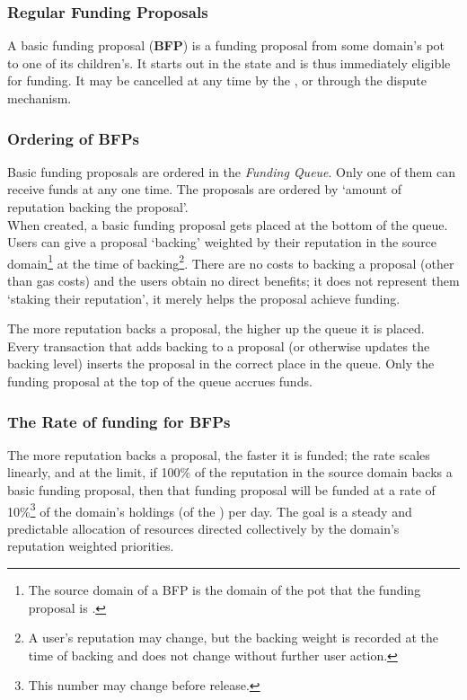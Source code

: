 %
%
%

\subsubsection{Regular Funding Proposals}\label{subsubsec:BFPs}
A basic funding proposal (\textbf{BFP}) is a funding proposal from some domain's pot to one of its children's. It starts out in the  state and is thus immediately eligible for funding. It may be cancelled at any time by the , or through the dispute mechanism.

\subsubsection*{Ordering of BFPs}
Basic funding proposals are ordered in the \emph{Funding Queue}. Only one of them can receive funds at any one time. The proposals are ordered by `amount of reputation backing the proposal'.\\
When created, a basic funding proposal gets placed at the bottom of the queue. Users can give a proposal `backing' weighted by their reputation in the source domain\footnote{The source domain of a BFP is the domain of the pot that the funding proposal is .} at the time of backing\footnote{A user's reputation may change, but the backing weight is recorded at the time of backing and does not change without further user action.}. There are no costs to backing a proposal (other than gas costs) and the users obtain no direct benefits; it does not represent them `staking their reputation', it merely helps the proposal achieve funding.

The more reputation backs a proposal, the higher up the queue it is placed. Every transaction that adds backing to a proposal (or otherwise updates the backing level) inserts the proposal in the correct place in the queue. Only the funding proposal at the top of the queue accrues funds.\\

\subsubsection*{The Rate of funding for BFPs}
The more reputation backs a proposal, the faster it is funded; the rate scales linearly, and at the limit, if 100\% of the reputation in the source domain backs a basic funding proposal, then that funding proposal will be funded at a rate of 10\%\footnote{This number may change before release.} of the domain's holdings (of the ) per day. 
The goal is a steady and predictable allocation of resources directed collectively by the domain's reputation weighted priorities.

